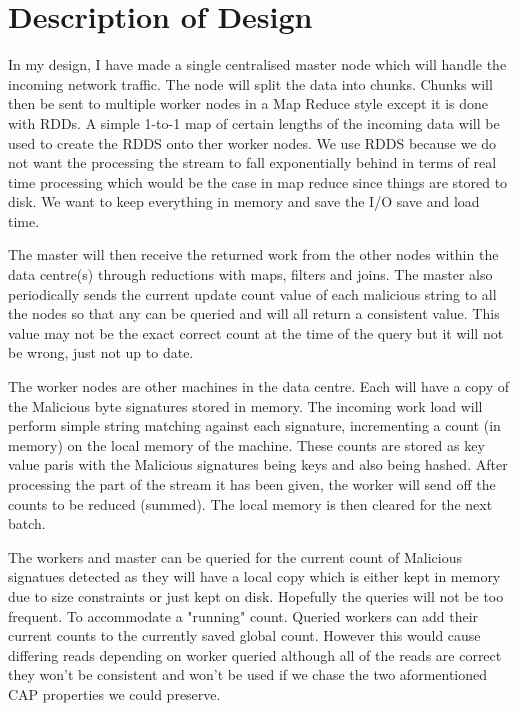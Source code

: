 \documentclass[11pt]{article}
\begin{document}
\section{Description of Design}
In my design, I have made a single centralised master node which
will handle the incoming network traffic. The node will split the
data into chunks. Chunks will then be sent to multiple worker
nodes in a Map Reduce style except it is done with RDDs. A simple
1-to-1 map of certain lengths of the incoming data will be used
to create the RDDS onto ther worker nodes. We use RDDS because
we do not want the processing the stream to fall exponentially
behind in terms of real time processing which would be the case
in map reduce since things are stored to disk. We want to keep
everything in memory and save the I/O save and load time.

The master will then receive the returned work from the other 
nodes within the data centre(s) through reductions with maps,
filters and joins. The master also periodically sends the current
update count value of each malicious string to all the nodes
so that any can be queried and will all return a consistent
value. This value may not be the exact correct count at the time
of the query but it will not be wrong, just not up to date. 

The worker nodes are other machines in the data centre. Each will
have a copy of the Malicious byte signatures stored in memory. 
The incoming work load will perform simple string matching 
against each signature, incrementing a count (in memory)
on the local memory of the machine. These counts are stored
as key value paris with the Malicious signatures being keys and
also being hashed. After processing the part of
the stream it has been given, the worker will send off the
counts to be reduced (summed). The local memory is then cleared
for the next batch. 

The workers and master can be queried for the current count of
Malicious signatues detected as they will have a local copy
which is either kept in memory due to size constraints or
just kept on disk. Hopefully the queries will not be too 
frequent. To accommodate a "running" count. Queried workers can
add their current counts to the currently saved global count. 
However this would cause differing reads depending on worker 
queried although all of the reads are correct they won't be
consistent and won't be used if we chase the two aformentioned
CAP properties we could preserve. 
\end{document}
